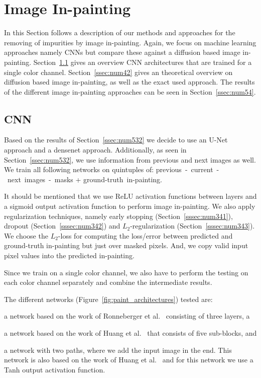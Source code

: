 \section{Image In-painting}
\label{sec:num4}

In this Section follows a description of our methods and approaches for the removing of impurities by image in-painting. Again, we focus on machine learning approaches namely CNNs but compare these against a diffusion based image in-painting. Section~\ref{ssec:num41} gives an overview CNN architectures that are trained for a single color channel. Section~\ref{ssec:num42} gives an theoretical overview on diffusion based image in-painting, as well as the exact used approach. 
The results of the different image in-painting approaches can be seen in Section~\ref{ssec:num54}.

\subsection{CNN}
\label{ssec:num41}

Based on the results of Section~\ref{ssec:num532} we decide to use an U-Net approach and a densenet approach. Additionally, as seen in Section~\ref{ssec:num532}, we use information from previous and next images as well. We train all following networks on quintuples of: previous~-~current~-~next~images~-~masks + ground-truth~in-painting.


It should be mentioned that we use ReLU activation functions between layers and a sigmoid output activation function to perform image in-painting. We also apply regularization techniques, namely early stopping (Section~\ref{sssec:num341}), dropout (Section~\ref{sssec:num342}) and $L_2$-regularization (Section~\ref{sssec:num343}). We choose the $L_2$-loss for computing the loss/error between predicted and ground-truth in-painting but just over masked pixels. And, we copy valid input pixel values into the predicted in-painting.

Since we train on a single color channel, we also have to perform the testing on each color channel separately and combine the intermediate results.


The different networks (Figure~\ref{fig:paint_architectures}) tested are: \begin{enumerate*}[label=(\alph*)]\item a network based on the work of Ronneberger et al.~\cite{Ronneberger15} consisting of three layers, a \item a network based on the work of Huang et al.~\cite{Huang16} that consists of five sub-blocks, and \item a network with two paths, where we add the input image in the end. This network is also based on the work of Huang et al.~\cite{Huang16} and for this network we use a Tanh output activation function.\end{enumerate*}



